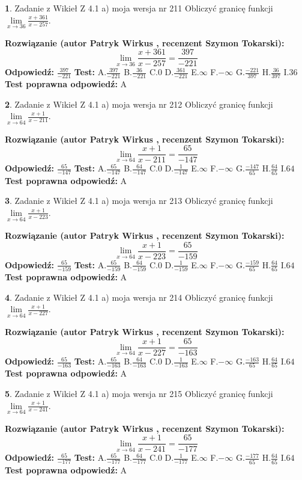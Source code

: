 \documentclass[12pt, a4paper]{article}
\theoremstyle{definition} %
\newtheorem{zad}{}
\newcommand{\zadStart}[1]{\begin{zad}#1\newline}
\newcommand{\zadStop}{\end{zad}}
\newcommand{\rozwStart}[2]{\noindent \textbf{Rozwiązanie (autor #1 , recenzent #2): }\newline}
\newcommand{\rozwStop}{\newline}
\newcommand{\odpStart}{\noindent \textbf{Odpowiedź:}\newline}
\newcommand{\odpStop}{\newline}
\newcommand{\testStart}{\noindent \textbf{Test:}\newline}
\newcommand{\testStop}{\newline}
\newcommand{\kluczStart}{\noindent \textbf{Test poprawna odpowiedź:}\newline}
\newcommand{\kluczStop}{\newline}
\begin{document}
\zadStart{Zadanie z Wikieł Z 4.1 a) moja wersja nr 211}
Obliczyć granicę funkcji $\lim\limits_{x\to36}\frac{x+361}{x-257}$.
\zadStop
\rozwStart{Patryk Wirkus}{Szymon Tokarski}
$$\lim\limits_{x\to36}\frac{x+361}{x-257} = \frac{397}{-221}$$
\rozwStop
\odpStart
$\frac{397}{-221}$
\odpStop
\testStart
A.$\frac{397}{-221}$
B.$\frac{36}{-221}$
C.$0$
D.$\frac{361}{-221}$
E.$\infty$
F.$-\infty$
G.$\frac{-221}{397}$
H.$\frac{36}{397}$
I.$36$
\testStop
\kluczStart
A
\kluczStop



\zadStart{Zadanie z Wikieł Z 4.1 a) moja wersja nr 212}
Obliczyć granicę funkcji $\lim\limits_{x\to64}\frac{x+1}{x-211}$.
\zadStop
\rozwStart{Patryk Wirkus}{Szymon Tokarski}
$$\lim\limits_{x\to64}\frac{x+1}{x-211} = \frac{65}{-147}$$
\rozwStop
\odpStart
$\frac{65}{-147}$
\odpStop
\testStart
A.$\frac{65}{-147}$
B.$\frac{64}{-147}$
C.$0$
D.$\frac{1}{-147}$
E.$\infty$
F.$-\infty$
G.$\frac{-147}{65}$
H.$\frac{64}{65}$
I.$64$
\testStop
\kluczStart
A
\kluczStop



\zadStart{Zadanie z Wikieł Z 4.1 a) moja wersja nr 213}
Obliczyć granicę funkcji $\lim\limits_{x\to64}\frac{x+1}{x-223}$.
\zadStop
\rozwStart{Patryk Wirkus}{Szymon Tokarski}
$$\lim\limits_{x\to64}\frac{x+1}{x-223} = \frac{65}{-159}$$
\rozwStop
\odpStart
$\frac{65}{-159}$
\odpStop
\testStart
A.$\frac{65}{-159}$
B.$\frac{64}{-159}$
C.$0$
D.$\frac{1}{-159}$
E.$\infty$
F.$-\infty$
G.$\frac{-159}{65}$
H.$\frac{64}{65}$
I.$64$
\testStop
\kluczStart
A
\kluczStop



\zadStart{Zadanie z Wikieł Z 4.1 a) moja wersja nr 214}
Obliczyć granicę funkcji $\lim\limits_{x\to64}\frac{x+1}{x-227}$.
\zadStop
\rozwStart{Patryk Wirkus}{Szymon Tokarski}
$$\lim\limits_{x\to64}\frac{x+1}{x-227} = \frac{65}{-163}$$
\rozwStop
\odpStart
$\frac{65}{-163}$
\odpStop
\testStart
A.$\frac{65}{-163}$
B.$\frac{64}{-163}$
C.$0$
D.$\frac{1}{-163}$
E.$\infty$
F.$-\infty$
G.$\frac{-163}{65}$
H.$\frac{64}{65}$
I.$64$
\testStop
\kluczStart
A
\kluczStop



\zadStart{Zadanie z Wikieł Z 4.1 a) moja wersja nr 215}
Obliczyć granicę funkcji $\lim\limits_{x\to64}\frac{x+1}{x-241}$.
\zadStop
\rozwStart{Patryk Wirkus}{Szymon Tokarski}
$$\lim\limits_{x\to64}\frac{x+1}{x-241} = \frac{65}{-177}$$
\rozwStop
\odpStart
$\frac{65}{-177}$
\odpStop
\testStart
A.$\frac{65}{-177}$
B.$\frac{64}{-177}$
C.$0$
D.$\frac{1}{-177}$
E.$\infty$
F.$-\infty$
G.$\frac{-177}{65}$
H.$\frac{64}{65}$
I.$64$
\testStop
\kluczStart
A
\kluczStop
\end{document}
